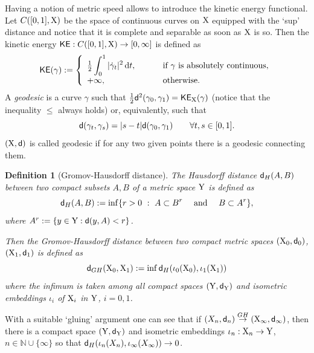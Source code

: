 \documentclass[11pt]{article}
\numberwithin{equation}{section}
\newtheorem{definition}[theorem]{Definition}
\newcommand{\N}{\mathbb{N}}
\newcommand{\X}{{\rm X}}
\newcommand{\Y}{{\rm Y}}
\newcommand{\sfd}{{\sf d}}
\renewcommand{\d}{{\rm d}}
\begin{document}
Having a notion of metric speed allows to introduce the kinetic energy functional. Let $C([0,1],\X)$ be the space of continuous curves on $\X$ equipped with the `sup' distance and notice that it is complete and separable as soon as $\X$ is so. Then the kinetic energy ${\sf KE}:C([0,1],\X)\to[0,\infty]$ is defined  as
\[
{\sf KE}(\gamma):=\left\{\begin{array}{ll}
\displaystyle{\tfrac12\int_0^1 |\dot\gamma_t|^2\,\d t},&\qquad\text{ if $\gamma$ is absolutely continuous},\\
+\infty,&\qquad\text{ otherwise.}
\end{array}
\right.
\]
A \emph{geodesic} is a curve $\gamma$ such that $\frac12\sfd^2(\gamma_0,\gamma_1)={\sf KE}_{\X}(\gamma)$ (notice that the inequality $\leq$ always holds) or, equivalently, such that
\begin{equation}
\label{eq:defgeod}
\sfd(\gamma_t,\gamma_s)=|s-t|\sfd(\gamma_0,\gamma_1)\qquad\forall t,s\in[0,1].
\end{equation}
$(\X,\sfd)$ is called geodesic if for any two given points there is a geodesic connecting them.


\begin{definition}[Gromov-Hausdorff distance] The Hausdorff distance $\sfd_{H}(A,B)$ between two compact subsets $A,B$ of a metric space $\Y$ is defined as
\[
\sfd_H(A,B):=\inf\{r>0\ :\ A\subset B^r\quad\text{ and }\quad B\subset A^r\},
\] 
where $A^r:=\{y\in \Y:\sfd(y,A)<r\}$. 

Then the Gromov-Hausdorff distance between two compact metric spaces $(\X_0,\sfd_0)$, $(\X_1,\sfd_1)$ is defined as
\[
\sfd_{GH}(\X_0,\X_1):=\inf \sfd_H(\iota_0(\X_0),\iota_1(\X_1))
\]
where the infimum is taken among all compact spaces $(\Y,\sfd_\Y)$ and isometric embeddings $\iota_i$ of $\X_i$ in $\Y$, $i=0,1$.
\end{definition}
With a suitable `gluing' argument one can see that if $(X_n,\sfd_n)\stackrel{GH}\to (\X_\infty,\sfd_{\infty})$, then there is a compact space $(\Y,\sfd_\Y)$ and isometric embeddings $\iota_n:\X_n\to\Y$, $n\in \N\cup\{\infty\}$ so that $\sfd_H(\iota_n(X_n),\iota_\infty(X_\infty))\to 0$.
\end{document}
